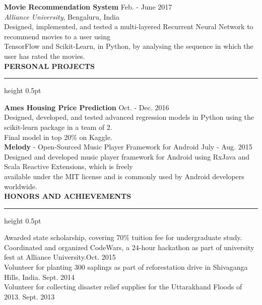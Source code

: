 \documentclass[a4paper]{article}
\newcommand{\myline}{\par
  \kern2pt %
  \hrule height 0.5pt
  \kern2pt %
}
\newcommand{\mybullet}{
	\indent \textbullet \hspace*{2mm}
}
\begin{document}
        \noindent
        \textbf{Movie Recommendation System} \hfill Feb. - June 2017\\
        \textit{Alliance University}, Bengaluru, India \\
        \mybullet Designed, implemented, and tested a multi-layered Recurrent Neural Network 
        to recommend movies to a user using \\ \hspace*{9mm} TensorFlow and Scikit-Learn, 
        in Python, by analysing the sequence in which the user has rated the movies. \\ 

	\noindent
	{\large \textbf{PERSONAL PROJECTS}}
	\myline 
	\smallskip
	
	\noindent
	\textbf{Ames Housing Price Prediction} \hfill Oct. - Dec. 2016 \\
	\mybullet Designed, developed, and tested advanced regression models in Python using 
        the scikit-learn package in a team of 2. \\
	\mybullet Final model in top 20\% on Kaggle. \\
	
	\noindent
	\textbf{Melody} - Open-Sourced Music Player Framework for Android \hfill July - Aug. 2015\\
	\mybullet Designed and developed music player framework for Android using RxJava and 
        Scala Reactive Extensions, which is freely\\ \hspace*{9mm} available under the MIT license 
        and is commonly used by Android developers worldwide. \\
	
	\noindent
	{\large \textbf{HONORS AND ACHIEVEMENTS}}
	\myline 
	\smallskip

        \mybullet Awarded state scholarship, covering 70\% tuition fee for undergraduate study. \\
        \mybullet Coordinated and organized CodeWars, a 24-hour hackathon as part of 
        university fest at Alliance University.\hfill Oct. 2015\\
        \mybullet Volunteer for planting 300 saplings as part of reforestation drive in 
        Shivaganga Hills, India. \hfill Sept. 2014 \\
        \mybullet Volunteer for collecting disaster relief supplies for the Uttarakhand Floods 
        of 2013. \hfill Sept. 2013 \\
		
	
\end{document}
